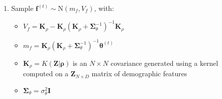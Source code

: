 \documentclass[12pt,letterpaper]{article}
\begin{document}
\begin{enumerate}[(1)]
\begin{itemize}
    \end{itemize}
    \item Sample $\textbf{f}^{(t)} \sim \text{N}(m_f, V_f)$, with:
    \begin{itemize}
        \item $V_f = \textbf{K}_{\rho} - \textbf{K}_{\rho}(\textbf{K}_{\rho} + \boldsymbol{\Sigma}_{\theta}^{-1})^{-1}\textbf{K}_{\rho}$
        \item $m_f = \textbf{K}_{\rho}(\textbf{K}_{\rho} + \boldsymbol{\Sigma}_{\theta}^{-1})^{-1}\boldsymbol{\theta}^{(t)}$
        \item $\textbf{K}_{\rho} = K(\textbf{Z}|\boldsymbol{\rho})$ is an $N \times N$ covariance generated using a kernel computed on a $\textbf{Z}_{N \times D}$ matrix of demographic features
        \item $\boldsymbol{\Sigma}_{\theta} = \sigma_{\theta}^{2}\textbf{I}$
    \end{itemize}
\end{enumerate}
\end{document}
